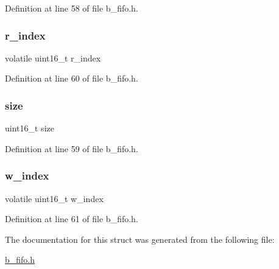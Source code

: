 Definition at line 58 of file b\+\_\+fifo.\+h.

\mbox{\label{structb_f_i_f_o___info__t_a57db0a4d3ff20bcc56f76881c520f4f6}} 
\subsubsection{\texorpdfstring{r\+\_\+index}{r\_index}}
{\footnotesize\ttfamily volatile uint16\+\_\+t r\+\_\+index}



Definition at line 60 of file b\+\_\+fifo.\+h.

\mbox{\label{structb_f_i_f_o___info__t_aaba88b24a21a6c70c895c0d55f4a69a0}} 
\subsubsection{\texorpdfstring{size}{size}}
{\footnotesize\ttfamily uint16\+\_\+t size}



Definition at line 59 of file b\+\_\+fifo.\+h.

\mbox{\label{structb_f_i_f_o___info__t_aab577f4558bd899926454eff3636f637}} 
\subsubsection{\texorpdfstring{w\+\_\+index}{w\_index}}
{\footnotesize\ttfamily volatile uint16\+\_\+t w\+\_\+index}



Definition at line 61 of file b\+\_\+fifo.\+h.



The documentation for this struct was generated from the following file\+:\begin{DoxyCompactItemize}
\item 
\mbox{\hyperlink{b__fifo_8h}{b\+\_\+fifo.\+h}}\end{DoxyCompactItemize}
